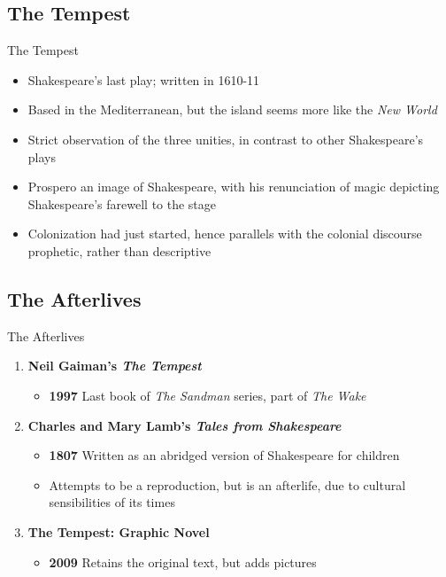 \documentclass{beamer}
\begin{document}
\subsection{The Tempest}
\begin{frame}{The Tempest ~\cite{tempest}}
  \begin{itemize}
    \item Shakespeare's last play; written in 1610-11
    \item Based in the Mediterranean, but the island seems more like the \emph{New World}
    \item Strict observation of the three unities, in contrast to other Shakespeare's plays 
    \item Prospero an image of Shakespeare, with his renunciation of magic depicting Shakespeare's farewell to the stage
    \item Colonization had just started, hence parallels with the colonial discourse prophetic, rather than descriptive
  \end{itemize}
\end{frame}

\subsection{The Afterlives}
\begin{frame}{The Afterlives}
  \begin{enumerate}
  \item \textbf{Neil Gaiman's \emph{The Tempest}}~\cite{gaimantempest}
    \begin{itemize}
    \item \textbf{1997} Last book of \emph{The Sandman} series, part of \emph{The Wake}
    \end{itemize}
  \item \textbf{Charles and Mary Lamb's \emph{Tales from Shakespeare} }~\cite{lamb}
    \begin{itemize}
    \item \textbf{1807} Written as an abridged version of Shakespeare for children
    \item Attempts to be a reproduction, but is an afterlife, due to cultural sensibilities of its times
    \end{itemize}
  \item \textbf{The Tempest: Graphic Novel}~\cite{tempestgraphicnovel}
    \begin{itemize}
    \item \textbf{2009} Retains the original text, but adds pictures
    \end{itemize}
  \end{enumerate}
\end{frame}
\end{document}
